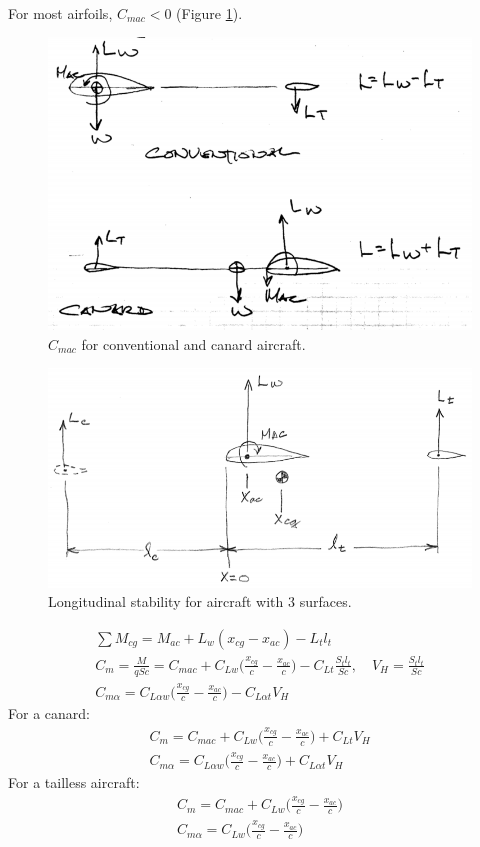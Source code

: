 \documentclass[draft=false, titlepage]{article}
\begin{document}
\paragraph*{}For most airfoils, $C_{mac} < 0$ (Figure \ref{fig:p105_ac}).
\begin{figure}[ht]
	\centering
	\includegraphics[width=0.6\linewidth]{Figures/p105_ac.PNG}
	\caption{$C_{mac}$ for conventional and canard aircraft.}
	\label{fig:p105_ac}
\end{figure}

\begin{figure}[ht]
	\centering
	\includegraphics[width=0.7\linewidth]{Figures/p106_longitudinalStability.PNG}
	\caption{Longitudinal stability for aircraft with 3 surfaces.}
	\label{fig:p106_longitudinalStability}
\end{figure}

\begin{gather*}
\sum M_{cg} = M_{ac} + L_w(x_{cg}-x_{ac}) - L_tl_t\\
C_m = \frac{M}{qSc} = C_{mac} + C_{Lw}\Big(\frac{x_{cg}}{c} - \frac{x_{ac}}{c}\Big) - C_{Lt} \frac{S_tl_t}{Sc}, \quad V_H = \frac{S_tl_t}{Sc}\\
C_{m\alpha} = C_{L\alpha w} \Big(\frac{x_{cg}}{c} - \frac{x_{ac}}{c}\Big) - C_{L\alpha t} V_H
\end{gather*}
For a canard:
\begin{gather*}
C_m = C_{mac} + C_{Lw} \Big(\frac{x_{cg}}{c} - \frac{x_{ac}}{c}\Big) + C_{Lt} V_H\\
C_{m\alpha} = C_{L\alpha w} \Big( \frac{x_{cg}}{c} - \frac{x_{ac}}{c} \Big) + C_{L\alpha t}V_H
\end{gather*}
For a tailless aircraft:
\begin{gather*}
C_m = C_{mac} + C_{Lw} \Big( \frac{x_{cg}}{c} - \frac{x_{ac}}{c} \Big)\\
C_{m\alpha} = C_{Lw}\Big( \frac{x_{cg}}{c} - \frac{x_{ac}}{c} \Big)
\end{gather*}
\end{document}

